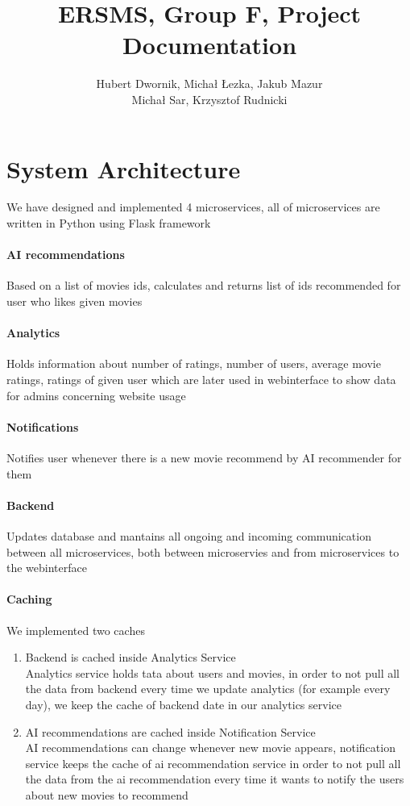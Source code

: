 \documentclass{article}
\title{ERSMS, Group F, Project Documentation}
\author{Hubert Dwornik, Michał Łezka, Jakub Mazur \\ Michał Sar, Krzysztof Rudnicki}
\begin{document}
\maketitle

\section{System Architecture} 
We have designed and implemented 4 microservices,
all of microservices are written in Python using Flask framework
\paragraph{AI recommendations}
Based on a list of movies ids, calculates and returns list of ids recommended for user who likes given movies
\paragraph{Analytics}
Holds information about number of 
ratings, number of users, 
average movie ratings, ratings of 
given user which are later used in 
webinterface to show data for admins 
concerning website usage
\paragraph{Notifications}
Notifies user whenever there is a new movie recommend by AI recommender for them 
\paragraph{Backend}
Updates database and mantains all ongoing and incoming communication between all microservices, both between microservies and from microservices to the webinterface
\paragraph{Caching}
We implemented two caches
\begin{enumerate}
    \item Backend is cached inside Analytics Service \\
    Analytics service holds tata about users and movies, 
    in order to not pull all the data from backend every time we update analytics
    (for example every day), we keep the cache of backend date in our analytics 
    service
    \item AI recommendations are cached inside Notification Service \\ 
    AI recommendations can change whenever new movie appears, notification 
    service keeps the cache of ai recommendation service in order to not 
    pull all the data from the ai recommendation every time it wants to notify 
    the users about new movies to recommend
\end{enumerate}
\end{document}
